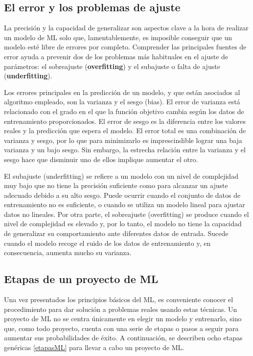  \subsection{El error y los problemas de ajuste}\label{1-Ajuste}
 
 La precisión y la capacidad de generalizar son aspectos clave a la hora de realizar un modelo de ML solo que, lamentablemente, es imposible conseguir que un modelo esté libre de errores por completo. Comprender las principales fuentes de error ayuda a prevenir dos de los problemas más habituales en el ajuste de parámetros: el sobreajuste (\textbf{overfitting}) y el subajuste o falta de ajuste (\textbf{underfitting}).
 
 Los errores principales en la predicción de un modelo, y que están asociados al algoritmo empleado, son la varianza y el sesgo (bias). El error de varianza está relacionado con el grado en el que la función objetivo cambia según los datos de entrenamiento proporcionados. El error de sesgo es la diferencia entre los valores reales y la predicción que espera el modelo. El error total es una combinación de varianza y sesgo, por lo que para minimizarlo es imprescindible lograr una baja varianza y un bajo sesgo. Sin embargo, la estrecha relación entre la varianza y el sesgo hace que disminuir uno de ellos
 implique aumentar el otro.
 
 El subajuste (underfitting) se refiere a un modelo con un nivel de complejidad muy bajo que no tiene la precisión suficiente como para alcanzar un ajuste adecuado debido a su alto sesgo. Puede ocurrir cuando el conjunto de datos de entrenamiento no es suficiente, o cuando se utiliza un modelo lineal para ajustar datos no lineales. Por otra parte, el sobreajuste (overfitting) se produce cuando el nivel de complejidad es elevado y, por lo tanto, el modelo no tiene la capacidad de generalizar su comportamiento ante diferentes datos de entrada. Sucede cuando el modelo recoge el ruido de los datos de entrenamiento y, en consecuencia, aumenta mucho su varianza.
 
 \subsection{Etapas de un proyecto de ML}\label{1-etapas}
 
 Una vez presentados los principios básicos del ML, es conveniente conocer el procedimiento para dar solución a problemas reales usando estas técnicas. Un proyecto de ML no se centra únicamente en elegir un modelo y entrenarlo, sino que, como todo proyecto, cuenta con una serie de etapas o pasos a seguir para aumentar sus probabilidades de éxito. A continuación, se describen ocho etapas genéricas \ref{etapasML} para llevar a cabo un proyecto de ML.
 
